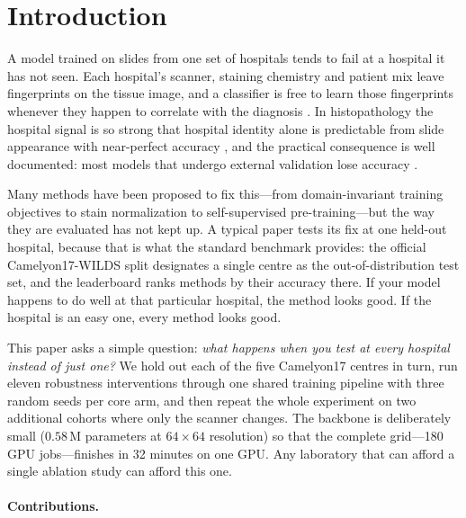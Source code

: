\documentclass[10pt]{article} %
\begin{document}
\section{Introduction}

A model trained on slides from one set of hospitals tends to fail at a hospital
it has not seen. Each hospital's scanner, staining chemistry and patient mix
leave fingerprints on the tissue image, and a classifier is free to learn those
fingerprints whenever they happen to correlate with the diagnosis
\citep{zech2018variable,geirhos2020shortcut}. In histopathology the hospital
signal is so strong that hospital identity alone is predictable from slide
appearance with near-perfect accuracy \citep{howard2021site}, and the practical
consequence is well documented: most models that undergo external validation
lose accuracy \citep{yu2022external}.

Many methods have been proposed to fix this---from domain-invariant training
objectives to stain normalization to self-supervised pre-training---but the way
they are evaluated has not kept up. A typical paper tests its fix at one
held-out hospital, because that is what the standard benchmark provides: the
official Camelyon17-WILDS split \citep{koh2021wilds} designates a single
centre as the out-of-distribution test set, and the leaderboard ranks methods
by their accuracy there. If your model happens to do well at that particular
hospital, the method looks good. If the hospital is an easy one, every method
looks good.

This paper asks a simple question: \emph{what happens when you test at every
hospital instead of just one?} We hold out each of the five Camelyon17 centres
in turn, run eleven robustness interventions through one shared training
pipeline with three random seeds per core arm, and then repeat the whole
experiment on two additional cohorts where only the scanner changes. The
backbone is deliberately small ($0.58$\,M parameters at $64\times64$
resolution) so that the complete grid---180 GPU jobs---finishes in 32 minutes
on one GPU. Any laboratory that can afford a single ablation study can afford
this one.

\paragraph{Contributions.}
\end{document}
